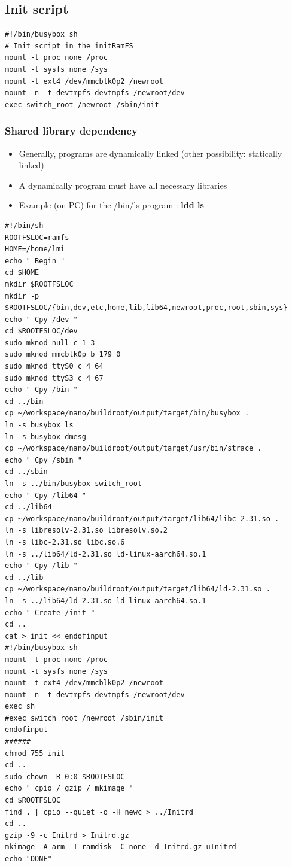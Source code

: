 \documentclass[resume]{subfiles}
\begin{document}
\subsection{Init script}
\begin{lstlisting}[style=console,label={},caption={}]
#!/bin/busybox sh
# Init script in the initRamFS
mount -t proc none /proc
mount -t sysfs none /sys
mount -t ext4 /dev/mmcblk0p2 /newroot
mount -n -t devtmpfs devtmpfs /newroot/dev
exec switch_root /newroot /sbin/init
\end{lstlisting}

\subsubsection{Shared library dependency}
\begin{itemize}
\item Generally, programs are dynamically linked (other possibility: statically linked)
\item A dynamically program must have all necessary libraries
\item Example (on PC) for the /bin/ls program : \textbf{ldd ls}
\end{itemize}

\begin{lstlisting}[style=console,label={lst:init_ramfs},caption={}]
#!/bin/sh
ROOTFSLOC=ramfs
HOME=/home/lmi
echo " Begin "
cd $HOME
mkdir $ROOTFSLOC
mkdir -p $ROOTFSLOC/{bin,dev,etc,home,lib,lib64,newroot,proc,root,sbin,sys}
echo " Cpy /dev "
cd $ROOTFSLOC/dev
sudo mknod null c 1 3
sudo mknod mmcblk0p b 179 0
sudo mknod ttyS0 c 4 64
sudo mknod ttyS3 c 4 67
echo " Cpy /bin "
cd ../bin
cp ~/workspace/nano/buildroot/output/target/bin/busybox .
ln -s busybox ls
ln -s busybox dmesg
cp ~/workspace/nano/buildroot/output/target/usr/bin/strace .
echo " Cpy /sbin "
cd ../sbin
ln -s ../bin/busybox switch_root
echo " Cpy /lib64 "
cd ../lib64
cp ~/workspace/nano/buildroot/output/target/lib64/libc-2.31.so .
ln -s libresolv-2.31.so libresolv.so.2
ln -s libc-2.31.so libc.so.6
ln -s ../lib64/ld-2.31.so ld-linux-aarch64.so.1
echo " Cpy /lib "
cd ../lib
cp ~/workspace/nano/buildroot/output/target/lib64/ld-2.31.so .
ln -s ../lib64/ld-2.31.so ld-linux-aarch64.so.1
echo " Create /init "
cd ..
cat > init << endofinput
#!/bin/busybox sh
mount -t proc none /proc
mount -t sysfs none /sys
mount -t ext4 /dev/mmcblk0p2 /newroot
mount -n -t devtmpfs devtmpfs /newroot/dev
exec sh
#exec switch_root /newroot /sbin/init
endofinput
######
chmod 755 init
cd ..
sudo chown -R 0:0 $ROOTFSLOC
echo " cpio / gzip / mkimage "
cd $ROOTFSLOC
find . | cpio --quiet -o -H newc > ../Initrd
cd ..
gzip -9 -c Initrd > Initrd.gz
mkimage -A arm -T ramdisk -C none -d Initrd.gz uInitrd
echo "DONE"
\end{lstlisting}
\end{document}
